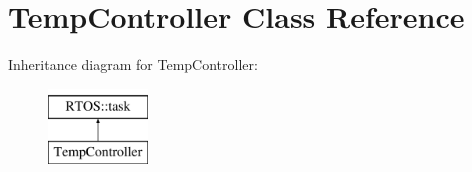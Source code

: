 \hypertarget{class_temp_controller}{}\section{Temp\+Controller Class Reference}
\label{class_temp_controller}
Inheritance diagram for Temp\+Controller\+:\begin{figure}[H]
\begin{center}
\leavevmode
\includegraphics[height=2.000000cm]{class_temp_controller}
\end{center}
\end{figure}
